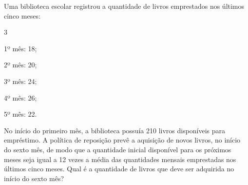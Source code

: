 %
%


\begin{exercicioBanco}[\valorquestao]
Uma biblioteca escolar registrou a quantidade de livros emprestados nos últimos cinco meses:

\begin{itemize}
    \begin{multicols}{3}
        \item 1º mês: 18;
        \item 2º mês: 20;
        \item 3º mês: 24;
        \item 4º mês: 26;
        \item 5º mês: 22.
    \end{multicols}
\end{itemize}

No início do primeiro mês, a biblioteca possuía 210 livros disponíveis para empréstimo. A política de reposição prevê a aquisição de novos livros, no início do sexto mês, de modo que a quantidade inicial disponível para os próximos meses seja igual a 12 vezes a média das quantidades mensais emprestadas nos últimos cinco meses. Qual é a quantidade de livros que deve ser adquirida no início do sexto mês?
\end{exercicioBanco}

